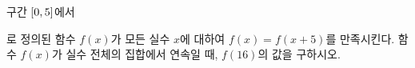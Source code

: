구간 $[0{,}\mkern3mu\mathopen{}5]$에서 \par\smallskip{}\par\smallskip\noindent 로 정의된 함수 $f(x)$가 모든 실수 $x$에 대하여 $f(x)=f(x+5)$를 만족시킨다. 함수 $f(x)$가 실수 전체의 집합에서 연속일 때, $f(16)$의 값을 구하시오. 
